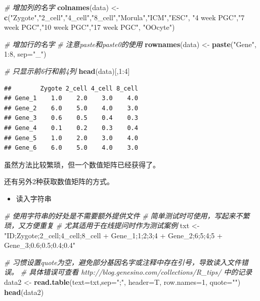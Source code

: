 \documentclass[]{article}
\newenvironment{Shaded}{\begin{snugshade}}{\end{snugshade}}
\newcommand{\KeywordTok}[1]{\textcolor[rgb]{0.13,0.29,0.53}{\textbf{{#1}}}}
\newcommand{\DataTypeTok}[1]{\textcolor[rgb]{0.13,0.29,0.53}{{#1}}}
\newcommand{\DecValTok}[1]{\textcolor[rgb]{0.00,0.00,0.81}{{#1}}}
\newcommand{\StringTok}[1]{\textcolor[rgb]{0.31,0.60,0.02}{{#1}}}
\newcommand{\CommentTok}[1]{\textcolor[rgb]{0.56,0.35,0.01}{\textit{{#1}}}}
\newcommand{\NormalTok}[1]{{#1}}
\providecommand{\tightlist}{%
  \setlength{\itemsep}{0pt}\setlength{\parskip}{0pt}}
\numberwithin{figure}{section}
\numberwithin{table}{section}
\theoremstyle{definition}
\theoremstyle{definition}
\theoremstyle{definition}
\theoremstyle{remark}
\begin{document}
\begin{Shaded}
\begin{Highlighting}[]
\CommentTok{# 增加列的名字}
\KeywordTok{colnames}\NormalTok{(data) <-}\StringTok{ }\KeywordTok{c}\NormalTok{(}\StringTok{"Zygote"}\NormalTok{,}\StringTok{"2_cell"}\NormalTok{,}\StringTok{"4_cell"}\NormalTok{,}\StringTok{"8_cell"}\NormalTok{,}\StringTok{"Morula"}\NormalTok{,}\StringTok{"ICM"}\NormalTok{,}\StringTok{"ESC"}\NormalTok{,}
        \StringTok{"4 week PGC"}\NormalTok{,}\StringTok{"7 week PGC"}\NormalTok{,}\StringTok{"10 week PGC"}\NormalTok{,}\StringTok{"17 week PGC"}\NormalTok{, }\StringTok{"OOcyte"}\NormalTok{)}

\CommentTok{# 增加行的名字}
\CommentTok{# 注意paste和paste0的使用}
\KeywordTok{rownames}\NormalTok{(data) <-}\StringTok{ }\KeywordTok{paste}\NormalTok{(}\StringTok{"Gene"}\NormalTok{, }\DecValTok{1}\NormalTok{:}\DecValTok{8}\NormalTok{, }\DataTypeTok{sep=}\StringTok{"_"}\NormalTok{)}

\CommentTok{# 只显示前6行和前4列}
\KeywordTok{head}\NormalTok{(data)[,}\DecValTok{1}\NormalTok{:}\DecValTok{4}\NormalTok{]}
\end{Highlighting}
\end{Shaded}

\begin{verbatim}
##        Zygote 2_cell 4_cell 8_cell
## Gene_1    1.0    2.0    3.0    4.0
## Gene_2    6.0    5.0    4.0    3.0
## Gene_3    0.6    0.5    0.4    0.3
## Gene_4    0.1    0.2    0.3    0.4
## Gene_5    1.0    2.0    3.0    4.0
## Gene_6    6.0    5.0    4.0    3.0
\end{verbatim}

虽然方法比较繁琐，但一个数值矩阵已经获得了。

还有另外2种获取数值矩阵的方式。

\begin{itemize}
\tightlist
\item
  读入字符串
\end{itemize}

\begin{Shaded}
\begin{Highlighting}[]
\CommentTok{# 使用字符串的好处是不需要额外提供文件}
\CommentTok{# 简单测试时可使用，写起来不繁琐，又方便重复}
\CommentTok{# 尤其适用于在线提问时作为测试案例}
\NormalTok{txt <-}\StringTok{ "ID;Zygote;2_cell;4_cell;8_cell}
\StringTok{+ Gene_1;1;2;3;4}
\StringTok{+ Gene_2;6;5;4;5}
\StringTok{+ Gene_3;0.6;0.5;0.4;0.4"}

\CommentTok{# 习惯设置quote为空，避免部分基因名字或注释中存在引号，导致读入文件错误。}
\CommentTok{# 具体错误可查看 http://blog.genesino.com/collections/R_tips/ 中的记录}
\NormalTok{data2 <-}\StringTok{ }\KeywordTok{read.table}\NormalTok{(}\DataTypeTok{text=}\NormalTok{txt,}\DataTypeTok{sep=}\StringTok{";"}\NormalTok{, }\DataTypeTok{header=}\NormalTok{T, }\DataTypeTok{row.names=}\DecValTok{1}\NormalTok{, }\DataTypeTok{quote=}\StringTok{""}\NormalTok{)}
\KeywordTok{head}\NormalTok{(data2)}
\end{Highlighting}
\end{Shaded}
\end{document}
